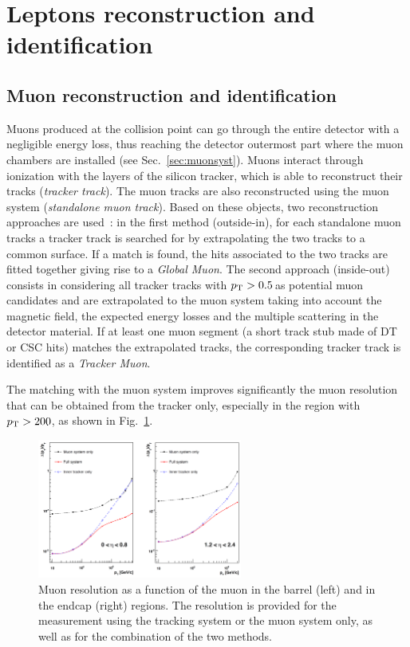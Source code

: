 \section{Leptons reconstruction and identification}\label{sec:leptonID}

\subsection{Muon reconstruction and identification}\label{sec:muID}
Muons produced at the collision point can go through the entire detector with a negligible energy loss, thus reaching the detector outermost part where the muon chambers are installed (see Sec.~\ref{sec:muonsyst}). Muons interact through ionization with the layers of the silicon tracker, which is able to reconstruct their tracks (\emph{tracker track}). The muon tracks are also reconstructed using the muon system (\emph{standalone muon track}). Based on these objects, two reconstruction approaches are used~\cite{Chatrchyan:2012xi}: in the first method (outside-in), for each standalone muon tracks a tracker track is searched for by extrapolating the two tracks to a common surface. If a match is found, the hits associated to the two tracks are fitted together giving rise to a \emph{Global Muon}. The second approach (inside-out) consists in considering all tracker tracks with $p_\mathrm{T} > 0.5$\,\GeV as potential muon candidates and are extrapolated to the muon system taking into account the magnetic field, the expected energy losses and the multiple scattering in the detector material. If at least one muon segment (a short track stub made of DT or CSC hits) matches the extrapolated tracks, the corresponding tracker track is identified as a \emph{Tracker Muon}.

The matching with the muon system improves significantly the muon \pt resolution that can be obtained from the tracker only, especially in the region with $p_\mathrm{T} > 200$\GeV, as shown in Fig.~\ref{fig:muptres}. 
\begin{figure}[htb]
\centering
\includegraphics[width=0.6\textwidth]{images/muptres.png}
\caption{Muon \pt resolution as a function of the muon \pt in the barrel (left) and in the endcap (right) regions. The resolution is provided for the measurement using the tracking system or the muon system only, as well as for the combination of the two methods.}\label{fig:muptres}
\end{figure}


